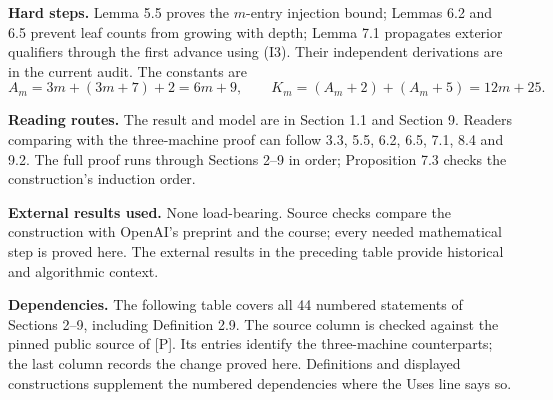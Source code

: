 \documentclass[11pt,a4paper]{article}
\theoremstyle{plain}
\theoremstyle{definition}
\begin{document}
\noindent\textbf{Hard steps.} Lemma 5.5 proves the $m$-entry injection bound; Lemmas 6.2 and 6.5 prevent leaf counts from growing with depth; Lemma 7.1 propagates exterior qualifiers through the first advance using (I3). Their independent derivations are in the current audit. The constants are
\[
 A_m=3m+(3m+7)+2=6m+9,\qquad
 K_m=(A_m+2)+(A_m+5)=12m+25.
\]

\noindent\textbf{Reading routes.} The result and model are in Section 1.1 and Section 9. Readers comparing with the three-machine proof can follow 3.3, 5.5, 6.2, 6.5, 7.1, 8.4 and 9.2. The full proof runs through Sections 2--9 in order; Proposition 7.3 checks the construction's induction order.

\noindent\textbf{External results used.} None load-bearing. Source checks compare the construction with OpenAI's preprint and the course; every needed mathematical step is proved here. The external results in the preceding table provide historical and algorithmic context.

\noindent\textbf{Dependencies.} The following table covers all 44 numbered statements of Sections 2--9, including Definition 2.9. The source column is checked against the pinned public source of [P]. Its entries identify the three-machine counterparts; the last column records the change proved here. Definitions and displayed constructions supplement the numbered dependencies where the Uses line says so.



\setcounter{section}{1}
\end{document}
